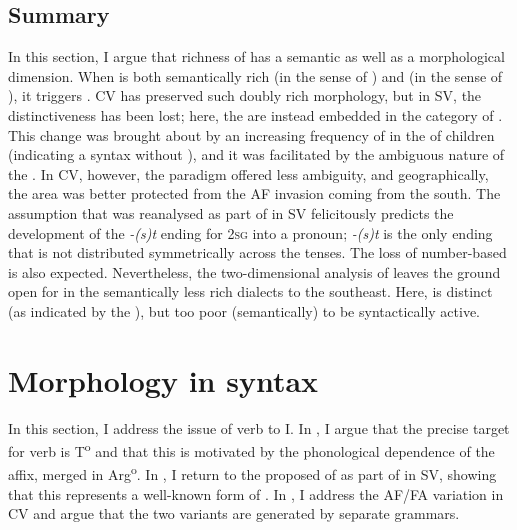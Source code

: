 \documentclass[output=paper,colorlinks,citecolor=brown,draft,draftmode]{langscibook}
\begin{document}
\subsection{Summary}\label{sec:petzell:4.4}


In this section, I argue that richness of  has a semantic as well as a morphological dimension. When  is both semantically rich (in the sense of \citealt{Tvica2017}) and  (in the sense of \citealt{BobaljikThrainsson1998}), it triggers . CV has preserved such doubly rich  morphology, but in SV, the distinctiveness has been lost; here, the  are instead embedded in the category of . This change was brought about by an increasing frequency of  in the  of children (indicating a syntax without ), and it was facilitated by the ambiguous nature of the . In CV, however, the paradigm offered less ambiguity, and geographically, the area was better protected from the AF invasion coming from the south. The assumption that  was reanalysed as part of  in SV felicitously predicts the development of the \textit{-(s)t} ending for 2\textsc{sg} into a pronoun; \textit{-(s)t} is the only ending that is not distributed symmetrically across the tenses. The loss of number-based  is also expected. Nevertheless, the two-dimensional analysis of  leaves the ground open for  in the semantically less rich dialects to the southeast. Here,  is distinct (as indicated by the ), but too poor (semantically) to be syntactically active.


\section{Morphology in syntax}\label{sec:petzell:5}


In this section, I address the issue of verb  to I. In , I argue that the precise target for verb  is T\textsuperscript{o} and that this  is motivated by the phonological dependence of the  affix, merged in Arg\textsuperscript{o}. In , I return to the proposed  of  as part of  in SV, showing that this represents a well-known form of . In , I address the AF/FA variation in CV and argue that the two variants are generated by separate grammars.
\end{document}
